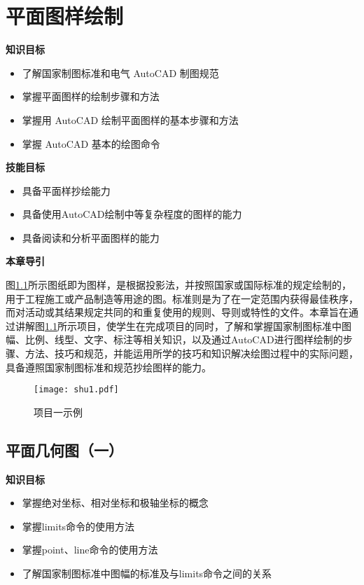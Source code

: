 \chapter{平面图样绘制}
{\bfseries 知识目标}
\begin{itemize}
\item 了解国家制图标准和电气 AutoCAD 制图规范
\item 掌握平面图样的绘制步骤和方法
\item 掌握用 AutoCAD 绘制平面图样的基本步骤和方法
\item 掌握 AutoCAD 基本的绘图命令
\end{itemize}

{\bfseries 技能目标}
\begin{itemize}
\item 具备平面样抄绘能力
\item 具备使用AutoCAD绘制中等复杂程度的图样的能力
\item 具备阅读和分析平面图样的能力
\end{itemize}

{\bfseries 本章导引}

图\ref{fig:shangmu1}所示图纸即为图样，是根据投影法，并按照国家或国际标准的规定绘制的，用于工程施工或产品制造等用途的图。标准则是为了在一定范围内获得最佳秩序，而对活动或其结果规定共同的和重复使用的规则、导则或特性的文件。本章旨在通过讲解图\ref{fig:shangmu1}所示项目，使学生在完成项目的同时，了解和掌握国家制图标准中图幅、比例、线型、文字、标注等相关知识，以及通过AutoCAD进行图样绘制的步骤、方法、技巧和规范，并能运用所学的技巧和知识解决绘图过程中的实际问题，具备遵照国家制图标准和规范抄绘图样的能力。
\noindent
\begin{landscape}
\begin{figure}[htbp]
\centering
\texttt{[image: shu1.pdf]}
\caption{项目一示例}\label{fig:shangmu1}
\end{figure}
\end{landscape}
\indent

\section{平面几何图（一）}\label{sec:gongzhi}

{\bfseries 知识目标}
\begin{itemize}
\item 掌握绝对坐标、相对坐标和极轴坐标的概念
\item 掌握limits命令的使用方法
\item 掌握point、line命令的使用方法
\item 了解国家制图标准中图幅的标准及与limits命令之间的关系
\end{itemize}

